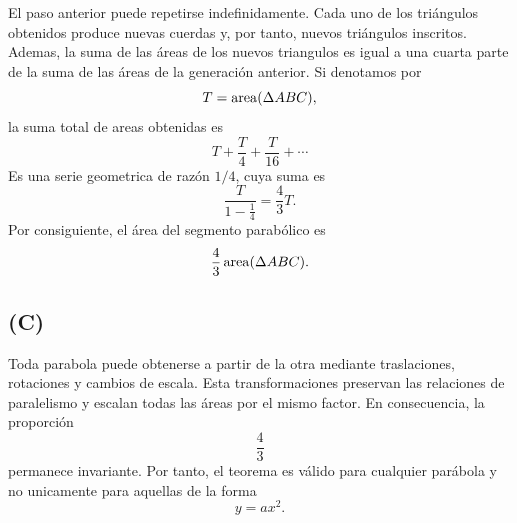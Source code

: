 \documentclass[12pt,a4paper]{article}
\begin{document}
\begin{solucion}
        El paso anterior puede repetirse indefinidamente. Cada uno de los triángulos obtenidos
        produce nuevas cuerdas y, por tanto, nuevos triángulos inscritos. Ademas, la suma de las
        áreas de los nuevos triangulos es igual a una cuarta parte de la suma de las áreas de
        la generación anterior. Si denotamos por
        \begin{equation*}
            T=\operatorname{area}(\Delta ABC),
        \end{equation*}
        la suma total de areas obtenidas es
        \begin{equation*}
            T+\frac{T}{4}+\frac{T}{16}+\cdots
        \end{equation*}
        Es una serie geometrica de razón $1/4$, cuya suma es
        \begin{equation*}
            \frac{T}{1-\frac{1}{4}}=\frac{4}{3}T.
        \end{equation*}
        Por consiguiente, el área del segmento parabólico es
        \begin{equation*}
            \frac{4}{3}\operatorname{area}(\Delta ABC).
        \end{equation*}

        \subsection*{(C)}

        Toda parabola puede obtenerse a partir de la otra mediante traslaciones, rotaciones
        y cambios de escala. Esta transformaciones preservan las relaciones de paralelismo
        y escalan todas las áreas por el mismo factor. En consecuencia, la proporción
        \begin{equation*}
            \frac{4}{3}
        \end{equation*}
        permanece invariante. Por tanto, el teorema es válido para cualquier parábola y no
        unicamente para aquellas de la forma
        \begin{equation*}
            y=ax^{2}.
        \end{equation*}
    \end{solucion}
    
\end{document}
